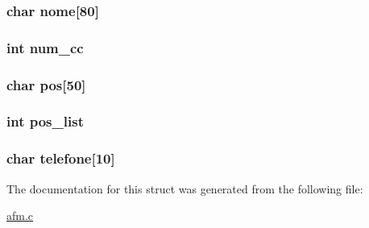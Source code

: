 \hypertarget{structjogador_a2fe8d29936547b4ede632f419ea32367}{
\subsubsection[{nome}]{\setlength{\rightskip}{0pt plus 5cm}char {\bf nome}\mbox{[}80\mbox{]}}}\label{structjogador_a2fe8d29936547b4ede632f419ea32367}
\hypertarget{structjogador_a561e04bb7721ed7305217ca1d72f1ed8}{
\subsubsection[{num\-\_\-cc}]{\setlength{\rightskip}{0pt plus 5cm}int {\bf num\-\_\-cc}}}\label{structjogador_a561e04bb7721ed7305217ca1d72f1ed8}
\hypertarget{structjogador_a7e6f061ca28cd2d7f3080f7944feebcd}{
\subsubsection[{pos}]{\setlength{\rightskip}{0pt plus 5cm}char {\bf pos}\mbox{[}50\mbox{]}}}\label{structjogador_a7e6f061ca28cd2d7f3080f7944feebcd}
\hypertarget{structjogador_a4cf0debbda53bf46c4417eecce803e04}{
\subsubsection[{pos\-\_\-list}]{\setlength{\rightskip}{0pt plus 5cm}int {\bf pos\-\_\-list}}}\label{structjogador_a4cf0debbda53bf46c4417eecce803e04}
\hypertarget{structjogador_a2b3e6e14a2f6909a2d7c095c16a343c8}{
\subsubsection[{telefone}]{\setlength{\rightskip}{0pt plus 5cm}char {\bf telefone}\mbox{[}10\mbox{]}}}\label{structjogador_a2b3e6e14a2f6909a2d7c095c16a343c8}


\-The documentation for this struct was generated from the following file\-:\begin{DoxyCompactItemize}
\item 
\hyperlink{afm_8c}{afm.\-c}\end{DoxyCompactItemize}
